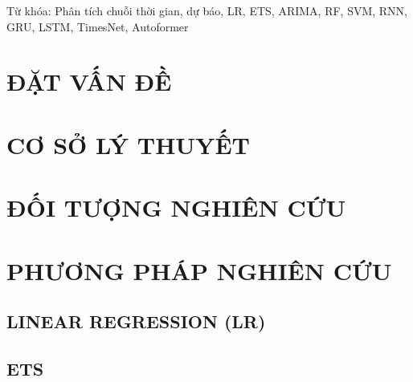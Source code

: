 \documentclass[conference]{IEEEtran}
\begin{document}
\maketitle
\thispagestyle{fancy}
\begin{abstract}

\end{abstract}

Từ khóa: Phân tích chuỗi thời gian, dự báo, LR, ETS, ARIMA, RF, SVM, RNN, GRU, LSTM, TimesNet, Autoformer

\section{ĐẶT VẤN ĐỀ}


\section{CƠ SỞ LÝ THUYẾT}




















\section{ĐỐI TƯỢNG NGHIÊN CỨU}


\section{PHƯƠNG PHÁP NGHIÊN CỨU}
\subsection{LINEAR REGRESSION (LR)}


\subsection{ETS}

\end{document}
